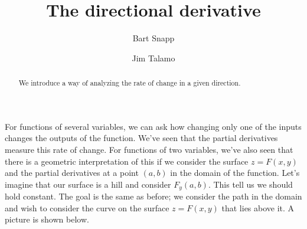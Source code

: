 \documentclass{ximera}
\author{Bart Snapp \and Jim Talamo}
\title[Dig-In:]{The directional derivative}
\begin{document}
\begin{abstract}
  We introduce a way of analyzing the rate of change in a given
  direction.
\end{abstract}
\maketitle


For functions of several variables, we can ask how changing only one of the inputs changes the outputs of the function.  We've seen that the partial derivatives measure this rate of change.  For functions of two variables, we've also seen that there is a geometric interpretation of this if we consider the surface $z=F(x,y)$ and the partial derivatives at a point $(a,b)$ in the domain of the function.  
Let's imagine that our surface is a hill and consider $F_y(a,b)$.  This tell us we should hold  constant.  The goal is the same as before; we consider the path  in the domain and wish to consider the curve on the surface $z=F(x,y)$ that lies above it.  A picture is shown below.
\end{document}
